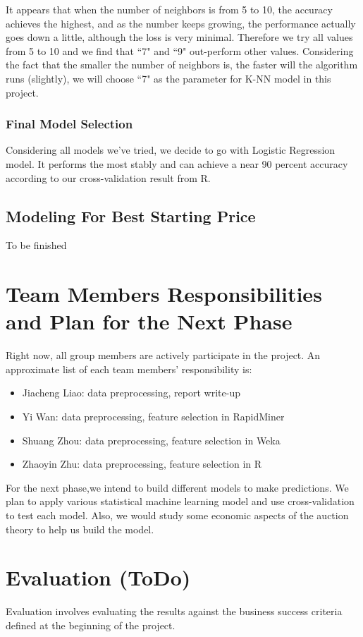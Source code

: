 \documentclass[CEJM,PDF]{cej} %
\begin{document}
It appears that when the number of neighbors is from 5 to 10, the accuracy achieves the highest, and as the number keeps growing, the performance actually goes down a little, although the loss is very minimal. Therefore we try all values from 5 to 10 and we find that ``7" and ``9" out-perform other values. Considering the fact that the smaller the number of neighbors is, the faster will the algorithm runs (slightly), we will choose ``7" as the parameter for K-NN model in this project.\\

\subsubsection{Final Model Selection}
Considering all models we've tried, we decide to go with Logistic Regression model. It performs the most stably and can achieve a near 90 percent accuracy according to our cross-validation result from R.

\subsection{Modeling For Best Starting Price}
To be finished


\section{Team Members Responsibilities and Plan for the Next Phase}

Right now, all group members are actively participate in the project. An approximate list of each team members' responsibility is:
\begin{itemize}
\item Jiacheng Liao: data preprocessing, report write-up
\item Yi Wan: data preprocessing, feature selection in RapidMiner
\item Shuang Zhou: data preprocessing, feature selection in Weka
\item Zhaoyin Zhu: data preprocessing, feature selection in R
\end{itemize}

For the next phase,we intend to build different models to make predictions. We plan to apply various statistical machine learning model and use cross-validation to test each model. Also, we would study some economic aspects of the auction theory to help us build the model.


\section{Evaluation (ToDo)}
Evaluation involves evaluating the results against the business success criteria defined at the beginning of the project.
\end{document}
